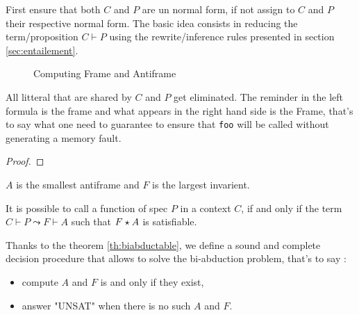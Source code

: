 First ensure that both $C$ and $P$ are un normal form, if not assign to $C$ and
$P$ their respective normal form.
The basic idea consists in reducing the term/proposition $C \vdash P$ using the
rewrite/inference rules presented in section \ref{sec:entailement}.
 
\begin{figure}[!htbf]
\label{fig:biabdprinciple}
\begin{center}
\resizebox{10cm}{!}{}
\end{center}
\caption{Computing Frame and Antiframe}
\end{figure}


All litteral that are shared by $C$ and $P$ get eliminated. 
The reminder in the left formula is the frame and what appears in the right 
hand side is the Frame, that's to say what one need to guarantee to ensure that 
\lstinline!foo! will be called
without generating a memory fault.  

\begin{lemma}
\end{lemma}
\begin{proof}
\end{proof}

\begin{lemma}
$A$ is the smallest antiframe and $F$ is the largest invarient.
\end{lemma} 

\begin{theorem}[Bi-abductability]
\label{th:biabductable}
It is possible to call a function of spec $P$ in a context $C$, if and only if
the term $C\vdash P \leadsto F \vdash A $ such that $F \star A$ is satisfiable.
\end{theorem}


Thanks to the theorem \ref{th:biabductable}, we define a sound and complete decision procedure that allows to solve the bi-abduction problem, that's to say :
\begin{itemize}
\item compute $A$ and $F$ is and only if they exist,
\item answer "UNSAT" when there is no such $A$ and $F$. 
\end{itemize} 



